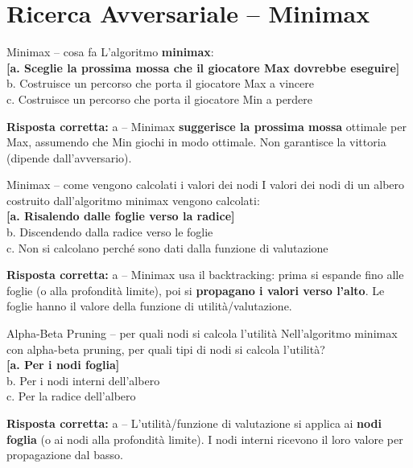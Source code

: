 \documentclass[12pt,a4paper]{article}
\newcommand{\corr}[1]{\textcolor{green!55!black}{\textbf{[#1]}}}
\newcommand{\risp}[1]{\begin{abox}\textbf{Risposta corretta: }#1\end{abox}}
\begin{document}
\section{Ricerca Avversariale -- Minimax}

\begin{qbox}{Minimax -- cosa fa}
L'algoritmo \textbf{minimax}:
\\[4pt]
\corr{a. Sceglie la prossima mossa che il giocatore Max dovrebbe eseguire}\\
b. Costruisce un percorso che porta il giocatore Max a vincere\\
c. Costruisce un percorso che porta il giocatore Min a perdere
\end{qbox}
\risp{a -- Minimax \textbf{suggerisce la prossima mossa} ottimale per Max, assumendo che Min giochi in modo ottimale. Non garantisce la vittoria (dipende dall'avversario).}

\bigskip
\begin{qbox}{Minimax -- come vengono calcolati i valori dei nodi}
I valori dei nodi di un albero costruito dall'algoritmo minimax vengono calcolati:
\\[4pt]
\corr{a. Risalendo dalle foglie verso la radice}\\
b. Discendendo dalla radice verso le foglie\\
c. Non si calcolano perché sono dati dalla funzione di valutazione
\end{qbox}
\risp{a -- Minimax usa il backtracking: prima si espande fino alle foglie (o alla profondità limite), poi si \textbf{propagano i valori verso l'alto}. Le foglie hanno il valore della funzione di utilità/valutazione.}

\bigskip
\begin{qbox}{Alpha-Beta Pruning -- per quali nodi si calcola l'utilità}
Nell'algoritmo minimax con alpha-beta pruning, per quali tipi di nodi si calcola l'utilità?
\\[4pt]
\corr{a. Per i nodi foglia}\\
b. Per i nodi interni dell'albero\\
c. Per la radice dell'albero
\end{qbox}
\risp{a -- L'utilità/funzione di valutazione si applica ai \textbf{nodi foglia} (o ai nodi alla profondità limite). I nodi interni ricevono il loro valore per propagazione dal basso.}

\end{document}
